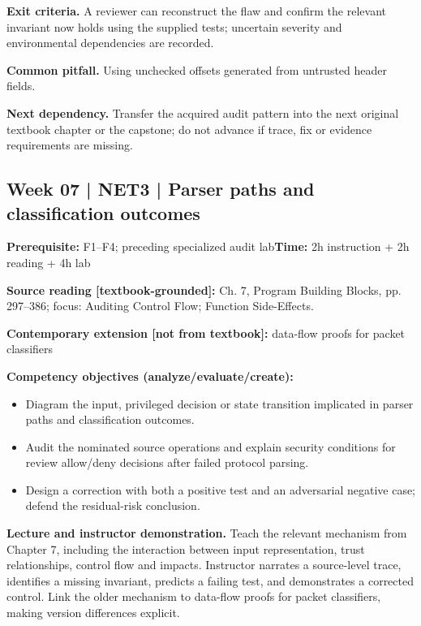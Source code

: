 \documentclass[10pt,letterpaper]{article}
\begin{document}
\textbf{Exit criteria.} A reviewer can reconstruct the flaw and confirm the relevant invariant now holds using the supplied tests; uncertain severity and environmental dependencies are recorded.

\textbf{Common pitfall.} Using unchecked offsets generated from untrusted header fields.

\textbf{Next dependency.} Transfer the acquired audit pattern into the next original textbook chapter or the capstone; do not advance if trace, fix or evidence requirements are missing.

\subsection{Week 07 | NET3 | Parser paths and classification outcomes}
\textbf{Prerequisite:} F1--F4; preceding specialized audit lab\hfill\textbf{Time:} 2h instruction + 2h reading + 4h lab

\textbf{Source reading [textbook-grounded]:} Ch. 7, Program Building Blocks, pp. 297--386; focus: Auditing Control Flow; Function Side-Effects.

\textbf{Contemporary extension [not from textbook]:} data-flow proofs for packet classifiers

\textbf{Competency objectives (analyze/evaluate/create):}
\begin{itemize}[leftmargin=*,itemsep=2pt]
\item Diagram the input, privileged decision or state transition implicated in parser paths and classification outcomes.
\item Audit the nominated source operations and explain security conditions for review allow/deny decisions after failed protocol parsing.
\item Design a correction with both a positive test and an adversarial negative case; defend the residual-risk conclusion.
\end{itemize}
\textbf{Lecture and instructor demonstration.} Teach the relevant mechanism from Chapter 7, including the interaction between input representation, trust relationships, control flow and impacts. Instructor narrates a source-level trace, identifies a missing invariant, predicts a failing test, and demonstrates a corrected control. Link the older mechanism to data-flow proofs for packet classifiers, making version differences explicit.
\end{document}
